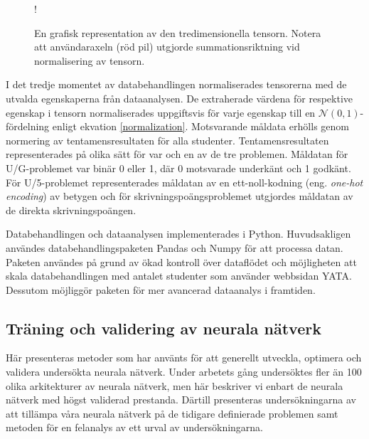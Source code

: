 \begin{wrapfigure}{r}{0.35\textwidth}
    \centering
    \resizebox {0.35\textwidth} {!} {
        
    }
    \caption{En grafisk representation av den tredimensionella tensorn. Notera att användaraxeln (röd pil) utgjorde summationsriktning vid normalisering av tensorn. }
    \label{fig:tensor}
\end{wrapfigure}


I det tredje momentet av databehandlingen normaliserades tensorerna med de utvalda egenskaperna från dataanalysen. De extraherade värdena för respektive egenskap i tensorn normaliserades uppgiftsvis för varje egenskap till en $\mathcal{N}(0,1)$-fördelning enligt ekvation \eqref{normalization}. Motsvarande måldata erhölls genom normering av tentamensresultaten för alla studenter. Tentamensresultaten representerades på olika sätt för var och en av de tre problemen. Måldatan för U/G-problemet var binär 0 eller 1, där 0 motsvarade underkänt och 1 godkänt. För U/5-problemet representerades måldatan av en ett-noll-kodning (eng. \emph{one-hot encoding}) av betygen och för skrivningspoängsproblemet utgjordes måldatan av de direkta skrivningspoängen.


Databehandlingen och dataanalysen implementerades i Python. Huvudsakligen användes databehandlingspaketen Pandas och Numpy för att processa datan. Paketen användes på grund av ökad kontroll över dataflödet och möjligheten att skala databehandlingen med antalet studenter som använder webbsidan YATA. Dessutom möjliggör paketen för mer avancerad dataanalys i framtiden.

\subsection{Träning och validering av neurala nätverk}
\label{sec:training_and_validation}
Här presenteras metoder som har använts för att generellt utveckla, optimera och validera undersökta neurala nätverk. Under arbetets gång undersöktes fler än 100 olika arkitekturer av neurala nätverk, men här beskriver vi enbart de neurala nätverk med högst validerad prestanda. Därtill presenteras undersökningarna av att tillämpa våra neurala nätverk på de tidigare definierade problemen samt metoden för en felanalys av ett urval av undersökningarna. 

